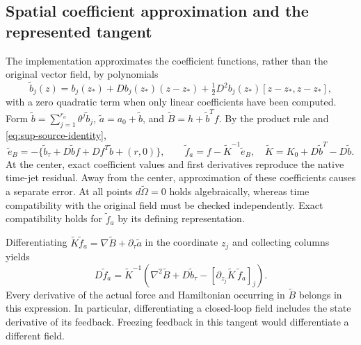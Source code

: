 \subsection{Spatial coefficient approximation and the represented tangent}
The implementation approximates the coefficient functions, rather than the original vector field, by polynomials
\begin{equation}
 \widetilde b_j(z)=b_j(z_*)+Db_j(z_*)(z-z_*)
       +\tfrac12D^2b_j(z_*)[z-z_*,z-z_*],
 \label{eq:sup-cache}
\end{equation}
with a zero quadratic term when only linear coefficients have been computed. Form $\widetilde b=\sum_{j=1}^{r_o}\theta^j\widetilde b_j$, $\widetilde a=a_0+\widetilde b$, and $\widetilde B=h+\widetilde b^Tf$. By the product rule and \eqref{eq:sup-source-identity},
\begin{equation}
 \widetilde e_B=-\{\widetilde b_\tau+D\widetilde b f+Df^T\widetilde b+(r,0)\},\qquad
 \widetilde f_a=f-\widetilde K^{-1}\widetilde e_B,
 \quad\widetilde K=K_0+D\widetilde b^T-D\widetilde b.
 \label{eq:sup-cache-field}
\end{equation}
At the center, exact coefficient values and first derivatives reproduce the native time-jet residual. Away from the center, approximation of these coefficients causes a separate error. At all points $d\widetilde\Omega=0$ holds algebraically, whereas time compatibility with the original field must be checked independently. Exact compatibility holds for $\widetilde f_a$ by its defining representation.

Differentiating $\widetilde K\widetilde f_a=\nabla\widetilde B+\partial_\tau\widetilde a$ in the coordinate $z_j$ and collecting columns yields
\begin{equation}
 D\widetilde f_a=\widetilde K^{-1}
 \left(\nabla^2\widetilde B+D\widetilde b_\tau
       -[\partial_{z_j}\widetilde K\,\widetilde f_a]_j\right).
 \label{eq:sup-represented-tangent}
\end{equation}
Every derivative of the actual force and Hamiltonian occurring in $\widetilde B$ belongs in this expression. In particular, differentiating a closed-loop field includes the state derivative of its feedback. Freezing feedback in this tangent would differentiate a different field.

